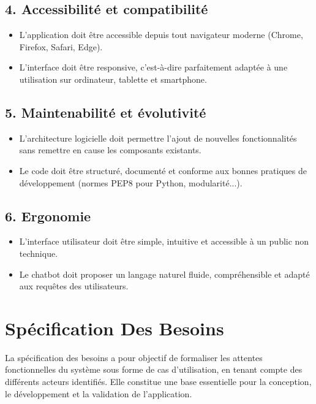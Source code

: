 \subsection*{4. Accessibilité et compatibilité}
\begin{itemize}
    \item L’application doit être accessible depuis tout navigateur moderne (Chrome, Firefox, Safari, Edge).
    \item L’interface doit être responsive, c’est-à-dire parfaitement adaptée à une utilisation sur ordinateur, tablette et smartphone.
\end{itemize}

\subsection*{5. Maintenabilité et évolutivité}
\begin{itemize}
    \item L’architecture logicielle doit permettre l’ajout de nouvelles fonctionnalités sans remettre en cause les composants existants.
    \item Le code doit être structuré, documenté et conforme aux bonnes pratiques de développement (normes PEP8 pour Python, modularité...).
\end{itemize}

\subsection*{6. Ergonomie}
\begin{itemize}
    \item L’interface utilisateur doit être simple, intuitive et accessible à un public non technique.
    \item Le chatbot doit proposer un langage naturel fluide, compréhensible et adapté aux requêtes des utilisateurs.
\end{itemize}

\section{Spécification Des Besoins}

La spécification des besoins a pour objectif de formaliser les attentes fonctionnelles du système sous forme de cas d’utilisation, en tenant compte des différents acteurs identifiés. Elle constitue une base essentielle pour la conception, le développement et la validation de l’application.

